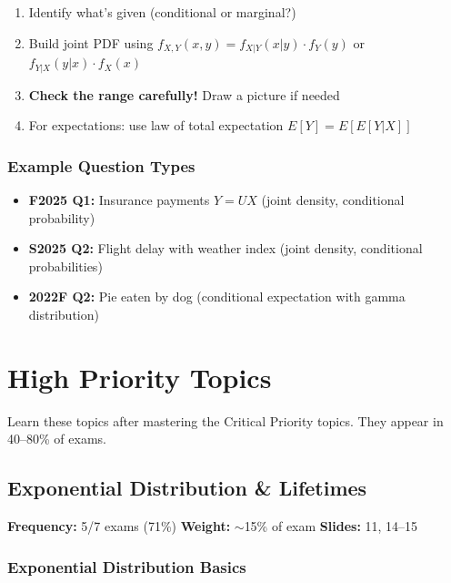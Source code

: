 \documentclass[11pt,letterpaper]{article}
\begin{document}
\begin{enumerate}[leftmargin=*]
  \item Identify what's given (conditional or marginal?)
  \item Build joint PDF using $f_{X,Y}(x,y) = f_{X|Y}(x|y) \cdot f_Y(y)$ or $f_{Y|X}(y|x) \cdot f_X(x)$
  \item \textbf{Check the range carefully!} Draw a picture if needed
  \item For expectations: use law of total expectation $E[Y] = E[E[Y|X]]$
\end{enumerate}

\subsubsection{Example Question Types}

\begin{itemize}[leftmargin=*]
  \item \textbf{F2025 Q1:} Insurance payments $Y = UX$ (joint density, conditional probability)
  \item \textbf{S2025 Q2:} Flight delay with weather index (joint density, conditional probabilities)
  \item \textbf{2022F Q2:} Pie eaten by dog (conditional expectation with gamma distribution)
\end{itemize}

\newpage

\section{High Priority Topics}

\begin{highbox}
Learn these topics after mastering the Critical Priority topics. They appear in 40--80\% of exams.
\end{highbox}

\subsection{Exponential Distribution \& Lifetimes}

\textbf{Frequency:} 5/7 exams (71\%) \quad \textbf{Weight:} $\sim$15\% of exam \quad \textbf{Slides:} 11, 14--15

\subsubsection{Exponential Distribution Basics}
\end{document}
